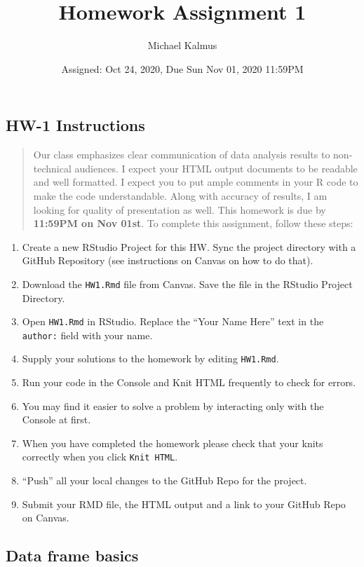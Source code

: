 \documentclass[
]{article}
\title{Homework Assignment 1}
\author{Michael Kalmus}
\date{Assigned: Oct 24, 2020, Due Sun Nov 01, 2020 11:59PM}
\begin{document}
\maketitle

\hypertarget{hw-1-instructions}{%
\subsection{HW-1 Instructions}\label{hw-1-instructions}}

\begin{quote}
Our class emphasizes clear communication of data analysis results to
non-technical audiences. I expect your HTML output documents to be
readable and well formatted. I expect you to put ample comments in your
R code to make the code understandable. Along with accuracy of results,
I am looking for quality of presentation as well. This homework is due
by \textbf{11:59PM on Nov 01st}. To complete this assignment, follow
these steps:
\end{quote}

\begin{enumerate}
\def\labelenumi{\arabic{enumi}.}
\item
  Create a new RStudio Project for this HW. Sync the project directory
  with a GitHub Repository (see instructions on Canvas on how to do
  that).
\item
  Download the \texttt{HW1.Rmd} file from Canvas. Save the file in the
  RStudio Project Directory.
\item
  Open \texttt{HW1.Rmd} in RStudio. Replace the ``Your Name Here'' text
  in the \texttt{author:} field with your name.
\item
  Supply your solutions to the homework by editing \texttt{HW1.Rmd}.
\item
  Run your code in the Console and Knit HTML frequently to check for
  errors.
\item
  You may find it easier to solve a problem by interacting only with the
  Console at first.
\item
  When you have completed the homework please check that your knits
  correctly when you click \texttt{Knit\ HTML}.
\item
  ``Push'' all your local changes to the GitHub Repo for the project.
\item
  Submit your RMD file, the HTML output and a link to your GitHub Repo
  on Canvas.
\end{enumerate}

\hypertarget{data-frame-basics}{%
\subsection{Data frame basics}\label{data-frame-basics}}
\end{document}

